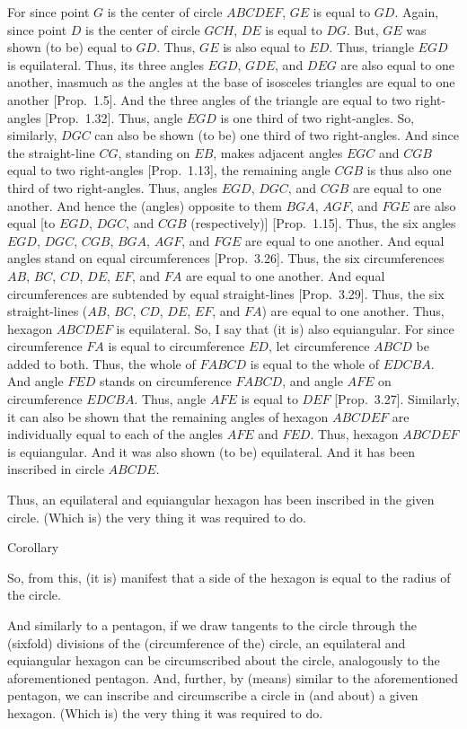 \begin{Parallel}{}{}
{For since point $G$ is the center of circle $ABCDEF$, $GE$ is equal to $GD$.
Again, since point $D$ is the center of circle $GCH$, $DE$ is equal to
$DG$. But, $GE$ was shown (to be) equal to $GD$. Thus, $GE$ is also equal to
$ED$. Thus, triangle $EGD$ is equilateral. Thus, its three angles
$EGD$, $GDE$, and $DEG$ are also equal to one another, inasmuch as the angles at the base of 
 isosceles triangles are equal to one another [Prop.~1.5]. And the three angles of the
 triangle are equal to
 two right-angles [Prop.~1.32].
 Thus, angle $EGD$ is one third of two right-angles. So, similarly,
  $DGC$ can also be shown (to be) one third of two right-angles.
   And since the straight-line $CG$, standing on $EB$, makes 
 adjacent angles $EGC$ and $CGB$ equal to two right-angles [Prop.~1.13], the remaining angle
 $CGB$ is thus also one third of two right-angles.
 Thus, angles $EGD$, $DGC$, and $CGB$ are equal to one another.
 And hence the (angles) opposite to them $BGA$, $AGF$, and $FGE$
 are also equal [to $EGD$, $DGC$, and $CGB$ (respectively)] [Prop.~1.15]. Thus,
 the six angles $EGD$, $DGC$, $CGB$, $BGA$, $AGF$, and $FGE$ are equal to one
 another. And equal angles stand on equal circumferences [Prop.~3.26]. Thus, the six circumferences
 $AB$, $BC$, $CD$, $DE$, $EF$, and $FA$ are equal to one another. And
  equal circumferences
  are subtended by equal straight-lines [Prop.~3.29]. Thus, the six
 straight-lines ($AB$, $BC$, $CD$, $DE$, $EF$, and $FA$) are equal to one another.
 Thus, hexagon $ABCDEF$ is equilateral. 
 So, I say that (it is) also equiangular. For since circumference $FA$
 is equal to circumference $ED$, let circumference $ABCD$ be added
 to both. Thus, the whole of $FABCD$ is equal to the whole of
 $EDCBA$. And angle $FED$ stands on circumference $FABCD$,
 and angle $AFE$ on circumference $EDCBA$. Thus, angle
 $AFE$ is equal to $DEF$ [Prop.~3.27].
 Similarly, it can also be shown that the remaining angles of hexagon
 $ABCDEF$ are individually equal to each of the angles $AFE$ and $FED$.
 Thus, hexagon $ABCDEF$ is equiangular. And it was also shown (to be)
 equilateral. And it has been inscribed in circle $ABCDE$.
 
 Thus, an equilateral and equiangular hexagon has been inscribed
 in the given circle. (Which is) the very thing it was required to do.\\
 
 \begin{center}
{\large Corollary}
\end{center}\vspace*{-7pt}

So, from this, (it is) manifest that a side of the hexagon is equal
to the radius of the circle.

And similarly to  a pentagon, if we draw  tangents to the circle through
the (sixfold) divisions of the (circumference of the) circle, an equilateral and equiangular hexagon
can be circumscribed about the circle, analogously to the aforementioned pentagon. And, further, by (means) similar to the aforementioned pentagon,
we can inscribe and circumscribe a circle in (and about) a given hexagon. 
(Which
is) the very thing it was required to do.}
\end{Parallel}
